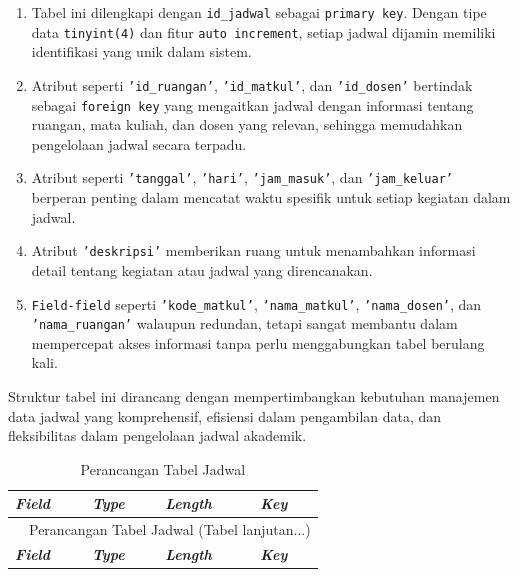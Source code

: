\begin{enumerate}
	      \begin{enumerate}[label=\alph*.]
		      \item Tabel ini dilengkapi dengan \texttt{id\_jadwal} sebagai \texttt{primary key}. Dengan tipe data \texttt{tinyint(4)} dan fitur \texttt{auto increment}, setiap jadwal dijamin memiliki identifikasi yang unik dalam sistem.
		      \item Atribut seperti \texttt{'id\_ruangan'}, \texttt{'id\_matkul'}, dan \texttt{'id\_dosen'} bertindak sebagai \texttt{foreign key} yang mengaitkan jadwal dengan informasi tentang ruangan, mata kuliah, dan dosen yang relevan, sehingga memudahkan pengelolaan jadwal secara terpadu.
		      \item Atribut seperti \texttt{'tanggal'}, \texttt{'hari'}, \texttt{'jam\_masuk'}, dan \texttt{'jam\_keluar'} berperan penting dalam mencatat waktu spesifik untuk setiap kegiatan dalam jadwal.
		      \item Atribut \texttt{'deskripsi'} memberikan ruang untuk menambahkan informasi detail tentang kegiatan atau jadwal yang direncanakan.
		      \item \texttt{Field-field} seperti \texttt{'kode\_matkul'}, \texttt{'nama\_matkul'}, \texttt{'nama\_dosen'}, dan \texttt{'nama\_ruangan'} walaupun redundan, tetapi sangat membantu dalam mempercepat akses informasi tanpa perlu menggabungkan tabel berulang kali.
	      \end{enumerate}

	      Struktur tabel ini dirancang dengan mempertimbangkan kebutuhan manajemen data jadwal yang komprehensif, efisiensi dalam pengambilan data, dan fleksibilitas dalam pengelolaan jadwal akademik.

		      {
			      \fontsize{10}{13}\selectfont
			      \begin{longtable}{p{3 cm} p{3cm} p{3 cm} p{3.4 cm}}
				      \caption{Perancangan Tabel Jadwal}
				      \label{admin}                                                                                               \\
				      \hline
				      \textbf{\textit{Field}} & \textbf{\textit{Type}} & \textbf{\textit{Length}} & \textbf{\textit{Key}}         \\
				      \hline
				      \endfirsthead

				      \multicolumn{4}{c}{\tablename\ \thetable\ {Perancangan Tabel Jadwal} \space (Tabel lanjutan...)}            \\
				      \hline
				      \textbf{\textit{Field}} & \textbf{\textit{Type}} & \textbf{\textit{Length}} & \textbf{\textit{Key}}         \\
				      \hline
				      \endhead


\end{longtable}}
\end{enumerate}
